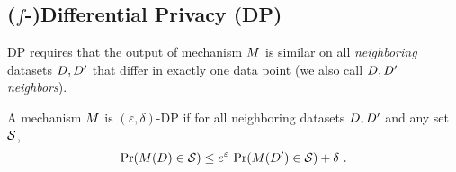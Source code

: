 


\subsection{($f$-)Differential Privacy (DP)} \label{sec:fdp}
DP requires that the output of mechanism $M$ is similar on all {\em neighboring} datasets $D, D'$ that differ in exactly one data point (we also call $D, D'$ {\em neighbors}). 



\begin{definition}
A mechanism $M$ is $(\varepsilon,\delta)$-DP if for all neighboring datasets $D, D'$ and any set $\mathcal{S}$, 
  \begin{equation*}    
\Pr(M(D) \in \mathcal{S}) \leq e^\varepsilon \, \Pr(M(D') \in \mathcal{S}) + \delta~.
\end{equation*}
\end{definition}



